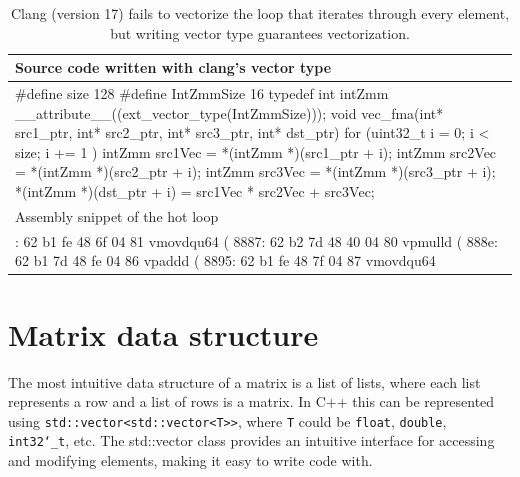 \documentclass[logo,bsc,singlespacing,parskip]{infthesis}
\newcommand{\dtint}{\texttt{int32\char`_t}}
\newcommand{\dtfloat}{\texttt{float}}
\newcommand{\dtdouble}{\texttt{double}}
\newenvironment{VerbatimCompact}
  {\vspace*{-2.5mm}\VerbatimEnvironment
   \par\Verbatim}
  {\endVerbatim\vspace*{-2.4mm}}
\begin{document}
\begin{table}[H]
\begin{tabular}{>{\raggedright\arraybackslash}p{14cm}}
\\
    Source code written with clang’s vector type\\
    \midrule
    \begin{VerbatimCompact}
#define size 128
#define IntZmmSize 16
typedef int intZmm __attribute__((ext_vector_type(IntZmmSize)));
void vec_fma(int* src1_ptr, int* src2_ptr,
             int* src3_ptr, int* dst_ptr) {
    for (uint32_t i = 0; i < size; i += 1 ){
        intZmm src1Vec = *(intZmm *)(src1_ptr + i);
        intZmm src2Vec = *(intZmm *)(src2_ptr + i);
        intZmm src3Vec = *(intZmm *)(src3_ptr + i);
        *(intZmm *)(dst_ptr + i) = src1Vec * src2Vec + src3Vec;
    }
}
    \end{VerbatimCompact}
    \\
    Assembly snippet of the hot loop\\
    \midrule
    \begin{VerbatimCompact}
8880: 62 b1 fe 48 6f 04 81  vmovdqu64 (%
8887: 62 b2 7d 48 40 04 80  vpmulld (%
888e: 62 b1 7d 48 fe 04 86  vpaddd (%
8895: 62 b1 fe 48 7f 04 87  vmovdqu64 %
    \end{VerbatimCompact}
    \\
\end{tabular}
\caption{Clang (version 17) fails to vectorize the loop that iterates through
every element, but writing vector type guarantees vectorization. }
\label{vec-fma-int}
\end{table}




\section{Matrix data structure}
\label{sec:mat-structure}
The most intuitive data structure of a matrix is a list of lists, where each
list represents a row and a list of rows is a matrix. In C++ this can be
represented using \texttt{std::vector<std::vector<T>>}, where \texttt{T} could
be \dtfloat{}, \dtdouble{}, \dtint{}, etc. The std::vector
class provides an intuitive interface for accessing and modifying elements,
making it easy to write code with. 
\end{document}
